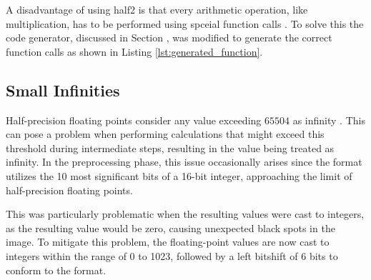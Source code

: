 A disadvantage of using \gls{half2} is that every arithmetic operation, like multiplication, has to be performed using spceial function calls \cite{nvidiaHalf2ArithmeticFunctions2023}.
To solve this the code generator, discussed in Section \todo, was modified to generate the correct function calls as shown in Listing \ref{lst:generated_function}.

\subsection{Small Infinities}
Half-precision floating points consider any value exceeding $65504$ as infinity \cite{HalfprecisionFloatingpointFormat2023}.
This can pose a problem when performing calculations that might exceed this threshold during intermediate steps, resulting in the value being treated as infinity.
In the preprocessing phase, this issue occasionally arises since the  format utilizes the 10 most significant bits of a 16-bit integer, approaching the limit of half-precision floating points.

This was particularly problematic when the resulting values were cast to integers, as the resulting value would be zero, causing unexpected black spots in the image.
To mitigate this problem, the floating-point values are now cast to integers within the range of 0 to 1023, followed by a left bitshift of 6 bits to conform to the  format.


